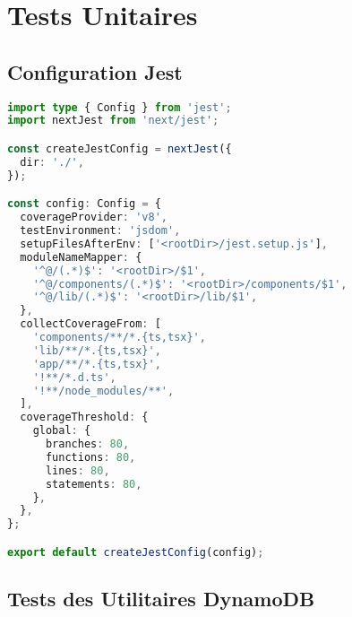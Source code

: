 \section{Tests Unitaires}

\subsection{Configuration Jest}

\begin{lstlisting}[language=TypeScript, caption=Configuration Jest]
import type { Config } from 'jest';
import nextJest from 'next/jest';

const createJestConfig = nextJest({
  dir: './',
});

const config: Config = {
  coverageProvider: 'v8',
  testEnvironment: 'jsdom',
  setupFilesAfterEnv: ['<rootDir>/jest.setup.js'],
  moduleNameMapper: {
    '^@/(.*)$': '<rootDir>/$1',
    '^@/components/(.*)$': '<rootDir>/components/$1',
    '^@/lib/(.*)$': '<rootDir>/lib/$1',
  },
  collectCoverageFrom: [
    'components/**/*.{ts,tsx}',
    'lib/**/*.{ts,tsx}',
    'app/**/*.{ts,tsx}',
    '!**/*.d.ts',
    '!**/node_modules/**',
  ],
  coverageThreshold: {
    global: {
      branches: 80,
      functions: 80,
      lines: 80,
      statements: 80,
    },
  },
};

export default createJestConfig(config);
\end{lstlisting}

\subsection{Tests des Utilitaires DynamoDB}

